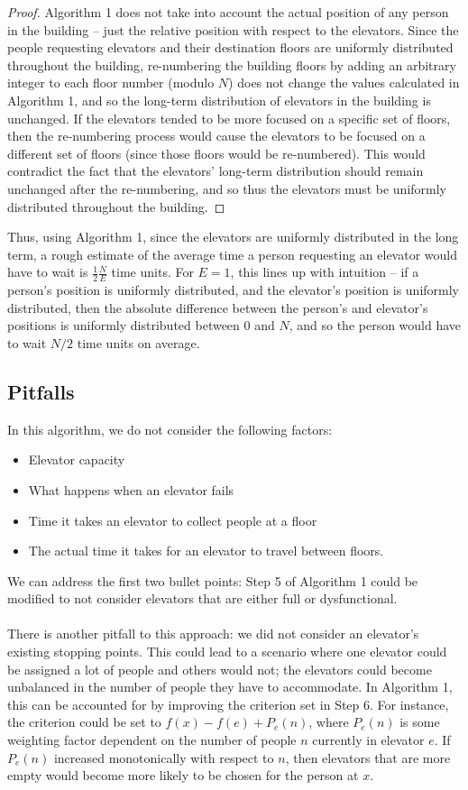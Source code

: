 \documentclass[letterpaper]{article} %
\begin{document}
\begin{proof}
	Algorithm 1 does not take into account the actual position of any person in the building -- just the relative position with respect to the elevators. Since the people requesting elevators and their destination floors are uniformly distributed throughout the building, re-numbering the building floors by adding an arbitrary integer to each floor number (modulo $N$) does not change the values calculated in Algorithm 1, and so the long-term distribution of elevators in the building is unchanged. If the elevators tended to be more focused on a specific set of floors, then the re-numbering process would cause the elevators to be focused on a different set of floors (since those floors would be re-numbered). This would contradict the fact that the elevators' long-term distribution should remain unchanged after the re-numbering, and so thus the elevators must be uniformly distributed throughout the building. 
\end{proof}

Thus, using Algorithm 1, since the elevators are uniformly distributed in the long term, a rough estimate of the average time a person requesting an elevator would have to wait is $\frac{1}{2}\frac{N}{E}$ time units. For $E = 1$, this lines up with intuition -- if a person's position is uniformly distributed, and the elevator's position is uniformly distributed, then the absolute difference between the person's and elevator's positions is uniformly distributed between $0$ and $N$, and so the person would have to wait $N/2$ time units on average. 

\subsection{Pitfalls}
In this algorithm, we do not consider the following factors:
\begin{itemize}
	\item Elevator capacity
	\item What happens when an elevator fails
	\item Time it takes an elevator to collect people at a floor
	\item The actual time it takes for an elevator to travel between floors.
\end{itemize}
We can address the first two bullet points: Step 5 of Algorithm 1 could be modified to not consider elevators that are either full or dysfunctional. \\\\
There is another pitfall to this approach: we did not consider an elevator's existing stopping points. This could lead to a scenario where one elevator could be assigned a lot of people and others would not; the elevators could become unbalanced in the number of people they have to accommodate. In Algorithm 1, this can be accounted for by improving the criterion set in Step 6. For instance, the criterion could be set to $f(x) - f(e) + P_{e}(n)$, where $P_{e}(n)$ is some weighting factor dependent on the number of people $n$ currently in elevator $e$. If $P_{e}(n)$ increased monotonically with respect to $n$, then elevators that are more empty would become more likely to be chosen for the person at $x$. 
\end{document}
